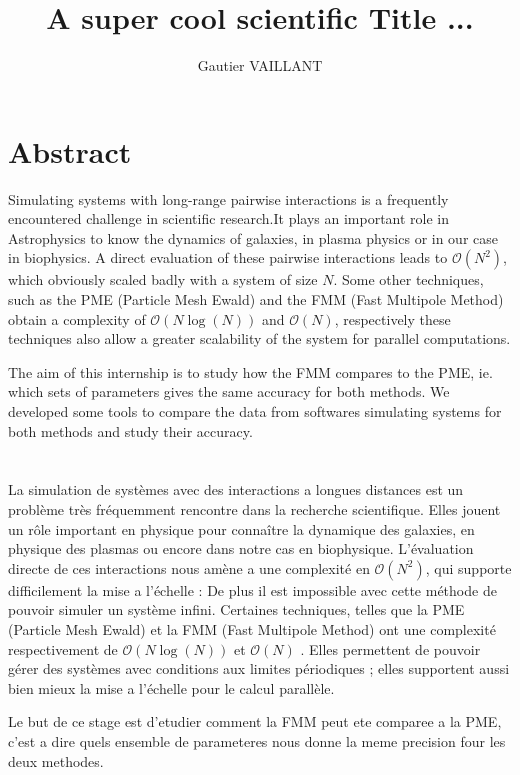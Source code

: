 \documentclass[10pt,twoside,a4paper]{report}
\title{A super cool scientific Title ...}
\author{Gautier VAILLANT}
\begin{document}
\maketitle



\chapter*{Abstract}

Simulating systems with long-range pairwise interactions is a frequently encountered challenge in scientific research.It plays an important role in Astrophysics to know the dynamics of galaxies, in plasma physics or in our case in biophysics.  A direct evaluation of these pairwise interactions leads to $\mathcal{O}(N^2)$, which obviously scaled badly with a system of size $N$. 
Some other techniques, such as the PME (Particle Mesh Ewald) and the FMM (Fast Multipole Method) obtain a complexity of $\mathcal{O}(N\log(N))$ and $\mathcal{O}(N)$,  respectively these techniques also allow a greater scalability of the system for parallel computations.

The aim of this internship is to study how the FMM compares to the PME, ie. which sets of parameters gives the same accuracy  for both methods. We developed some tools to compare the data from softwares simulating systems for both methods and study their accuracy. 
\\
\\
\\

La simulation de systèmes avec des interactions a longues distances est un problème très fréquemment rencontre dans la recherche scientifique. Elles jouent un rôle important en physique pour connaître la dynamique des galaxies, en physique des plasmas ou encore dans notre cas en biophysique. L'évaluation directe de ces interactions nous amène a une complexité en $\mathcal{O}(N^2)$, qui supporte difficilement la mise a l'échelle : De plus il est impossible avec cette méthode de pouvoir simuler un système infini.
	Certaines techniques, telles que la PME (Particle Mesh Ewald) et la FMM (Fast Multipole Method) ont une complexité respectivement de $\mathcal{O}(N\log(N))$ et $\mathcal{O}(N)$ . Elles permettent de pouvoir gérer des systèmes avec conditions aux limites périodiques ; elles supportent aussi bien mieux la mise a l'échelle pour le calcul parallèle.
	
	Le but de ce stage est d'etudier comment la FMM peut ete comparee a la PME, c'est a dire quels ensemble de parameteres nous donne la meme precision four les deux methodes.
\end{document}
